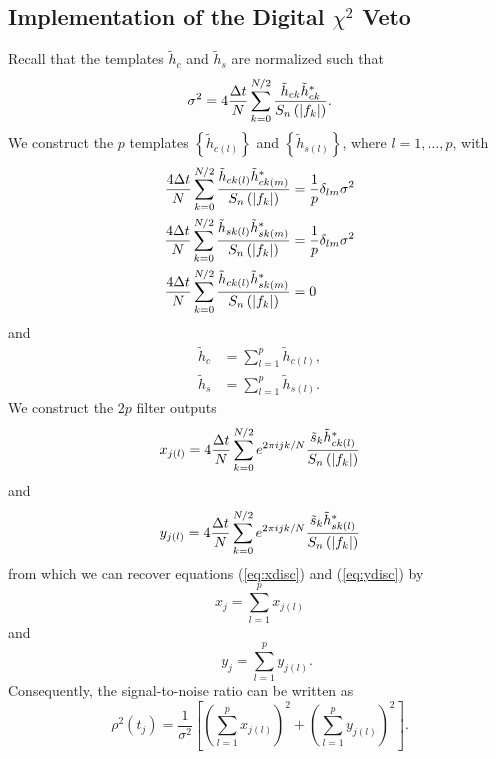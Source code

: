\subsection{Implementation of the Digital $\chi^2$ Veto}
\label{ss:chisqdisc}

Recall that the templates $\tilde{h}_c$ and $\tilde{h}_s$ are normalized such
that
\begin{equation}
\sigma^2 = 4 \frac{\Delta t}{N} \sum_{k=0}^{N/2}
\frac{\tilde{h}_{ck} \tilde{h}_{ck}^\ast } {S_n\left(\left|f_{k}\right|\right)}.
\end{equation}
We construct the $p$ templates $\left\{ \tilde{h}_{c(l)} \right\}$ and 
$\left\{ \tilde{h}_{s(l)} \right\}$, where $l = 1,\ldots,p$, with
\begin{align}
\frac{4\Delta t}{N} \sum_{k=0}^{N/2} 
\frac{\tilde{h}_{ck(l)} \tilde{h}_{ck(m)}^\ast}{S_n\left(\left|f_{k}\right|\right)} &= \frac{1}{p}\delta_{lm}\sigma^2 \\
\frac{4\Delta t}{N} \sum_{k=0}^{N/2} 
\frac{\tilde{h}_{sk(l)} \tilde{h}_{sk(m)}^\ast}{S_n\left(\left|f_{k}\right|\right)} &= \frac{1}{p}\delta_{lm}\sigma^2 \\
\frac{4\Delta t}{N} \sum_{k=0}^{N/2} 
\frac{\tilde{h}_{ck(l)} \tilde{h}_{sk(m)}^\ast}{S_n\left(\left|f_{k}\right|\right)} &= 0
\end{align}
and
\begin{align}
\tilde{h}_{c} &= \sum_{l=1}^{p} \tilde{h}_{c(l)}, \\
\tilde{h}_{s} &= \sum_{l=1}^{p} \tilde{h}_{s(l)}.
\end{align}
We construct the $2p$ filter outputs
\begin{equation}
x_{j(l)} = 4 \frac{\Delta t}{N} 
   \sum_{k=0}^{N/2} e^{2\pi ijk/N} 
   \frac{\tilde{s}_k \tilde{h}_{ck(l)}^\ast}
        {S_n\left(\left|f_{k}\right|\right)}
\end{equation}
and
\begin{equation}
y_{j(l)} = 4 \frac{\Delta t}{N} 
   \sum_{k=0}^{N/2} e^{2\pi ijk/N} 
   \frac{\tilde{s}_k \tilde{h}_{sk(l)}^\ast}
        {S_n\left(\left|f_{k}\right|\right)}
\end{equation}
from which we can recover equations (\ref{eq:xdisc}) and (\ref{eq:ydisc}) by
\begin{equation}
x_j = \sum_{l = 1}^{p} x_{j(l)}
\end{equation}
and
\begin{equation}
\quad y_j = \sum_{l = 1}^{p} y_{j(l)}.
\end{equation}
Consequently, the signal-to-noise ratio can be written as
\begin{equation}
\rho^2(t_j) = \frac{1}{\sigma^2} \left[ \left( \sum_{l = 1}^{p} x_{j(l)} \right)^2 + \left( \sum_{l = 1}^{p} y_{j(l)} \right )^2 \right].
\end{equation}
